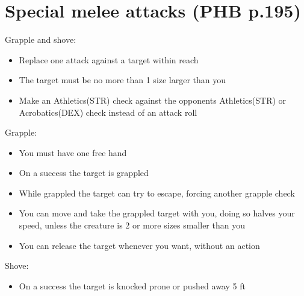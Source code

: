 \documentclass[a4paper]{article}
\begin{document}
\section{Special melee attacks \small (PHB p.195)}
Grapple and shove:
\begin{itemize}
\item Replace one attack against a target within reach
\item The target must be no more than 1 size larger than you
\item Make an Athletics(STR) check against the opponents Athletics(STR) or Acrobatics(DEX) check instead of an attack roll
\end{itemize}
Grapple:
\begin{itemize}
\item You must have one free hand
\item On a success the target is grappled
\item While grappled the target can try to escape, forcing another grapple check
\item You can move and take the grappled target with you, doing so halves your speed, unless the creature is 2 or more sizes smaller than you
\item You can release the target whenever you want, without an action
\end{itemize}
Shove:
\begin{itemize}
\item On a success the target is knocked prone or pushed away 5 ft
\end{itemize}
\end{document}
